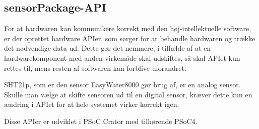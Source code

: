 \subsection{sensorPackage-API}

For at hardwaren kan kommunikere korrekt med den høj-intellektuelle software, er der oprettet hardware APIer, som sørger for at behandle hardwaren og trække det nødvendige data ud. Dette gør det nemmere, i tilfælde af at en hardwarekomponent med anden virkemåde skal udskiftes, så skal APIet kun rettes til, mens resten af softwaren kan forblive uforandret. 

SHT21p, som er den sensor EasyWater8000 gør brug af, er en analog sensor. Skulle man vælge at skifte sensoren ud til en digital sensor, kræver dette kun en ændring i APIet for at hele systemet virker korrekt igen. 

Disse APIer er udviklet i PSoC Crator med tilhørende PSoC4. 